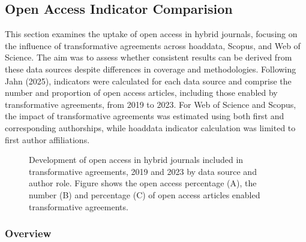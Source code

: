 \documentclass[a4paper,man,floatsintext,longtable,noextraspace,10pt]{apa6}
\begin{document}
\subsection{Open Access Indicator
Comparision}\label{open-access-indicator-comparision}

This section examines the uptake of open access in hybrid journals,
focusing on the influence of transformative agreements across hoaddata,
Scopus, and Web of Science. The aim was to assess whether consistent
results can be derived from these data sources despite differences in
coverage and methodologies. Following Jahn (2025), indicators were
calculated for each data source and comprise the number and proportion
of open access articles, including those enabled by transformative
agreements, from 2019 to 2023. For Web of Science and Scopus, the impact
of transformative agreements was estimated using both first and
corresponding authorships, while hoaddata indicator calculation was
limited to first author affiliations.

\begin{figure}[ht!]


\caption{\label{fig-uptake_overview}Development of open access in hybrid
journals included in transformative agreements, 2019 and 2023 by data
source and author role. Figure shows the open access percentage (A), the
number (B) and percentage (C) of open access articles enabled
transformative agreements.}

\end{figure}%

\subsubsection{Overview}\label{overview-1}
\end{document}
